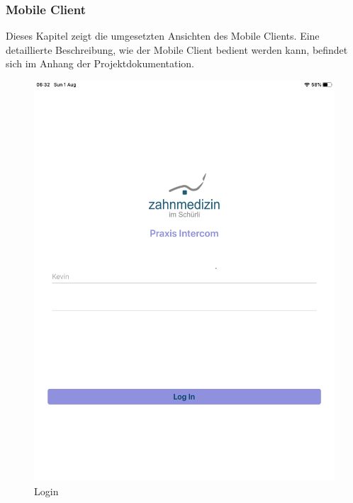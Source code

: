 \subsubsection{Mobile Client}\label{subsec:mobile-client-realisation}

Dieses Kapitel zeigt die umgesetzten Ansichten des Mobile Clients.
Eine detaillierte Beschreibung, wie der Mobile Client bedient werden kann, befindet sich im Anhang der Projektdokumentation.

\begin{figure}[h]
    \centering
    \begin{minipage}[b]{0.4\textwidth}
        \includegraphics[width=\textwidth]{graphics/screenshot-login}
        \caption{Login}
    \end{minipage}
    \hfill
    \begin{minipage}[b]{0.4\textwidth}

\end{minipage}
\end{figure}
